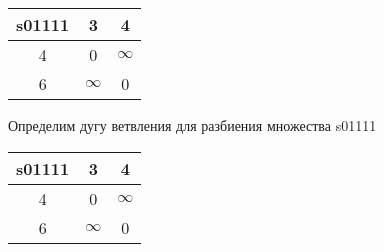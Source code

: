\documentclass[a4paper,10pt]{report} %
\begin{document}
\begin{tabular}[]{|c|c|c|}
\hline
s01111 & 3 & 4\\
\hline
4 &      0 & $\infty$\\
\hline
6 & $\infty$ &      0\\
\hline
\end{tabular}
\newpage


Определим дугу ветвления для разбиения множества  s01111\\
\begin{flushleft}\begin{tabular}[]{|c|c|c|}
\hline
s01111 & 3 & 4\\
\hline
4 &      0 & $\infty$\\
\hline
6 & $\infty$ &      0\\
\hline
\end{tabular}
\end{flushleft}



\newpage
\end{document}
